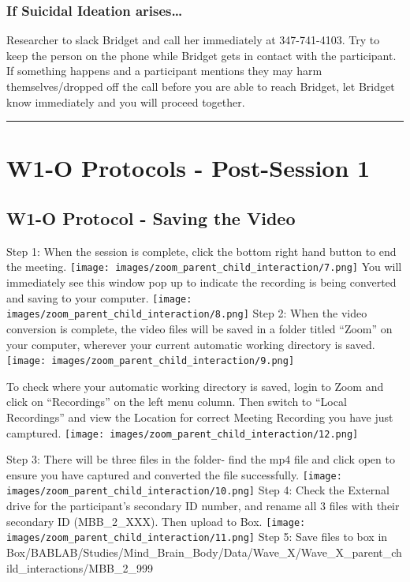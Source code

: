 \documentclass[
]{book}
\begin{document}
\hypertarget{if-suicidal-ideation-arises}{%
\subsubsection{If Suicidal Ideation arises\ldots{}}\label{if-suicidal-ideation-arises}}

Researcher to slack Bridget and call her immediately at 347-741-4103. Try to keep the person on the phone while Bridget gets in contact with the participant. If something happens and a participant mentions they may harm themselves/dropped off the call before you are able to reach Bridget, let Bridget know immediately and you will proceed together.

\begin{center}\rule{0.5\linewidth}{0.5pt}\end{center}

\hypertarget{w1-o-protocols---post-session-1}{%
\section{W1-O Protocols - Post-Session 1}\label{w1-o-protocols---post-session-1}}

\hypertarget{w1-o-protocol---saving-the-video}{%
\subsection{W1-O Protocol - Saving the Video}\label{w1-o-protocol---saving-the-video}}

Step 1:
When the session is complete, click the bottom right hand button to end the meeting. \texttt{[image: images/zoom\_parent\_child\_interaction/7.png]} You will immediately see this window pop up to indicate the recording is being converted and saving to your computer. \texttt{[image: images/zoom\_parent\_child\_interaction/8.png]}
Step 2:
When the video conversion is complete, the video files will be saved in a folder titled ``Zoom'' on your computer, wherever your current automatic working directory is saved. \texttt{[image: images/zoom\_parent\_child\_interaction/9.png]}

To check where your automatic working directory is saved, login to Zoom and click on ``Recordings'' on the left menu column. Then switch to ``Local Recordings'' and view the Location for correct Meeting Recording you have just camptured. \texttt{[image: images/zoom\_parent\_child\_interaction/12.png]}

Step 3:
There will be three files in the folder- find the mp4 file and click open to ensure you have captured and converted the file successfully. \texttt{[image: images/zoom\_parent\_child\_interaction/10.png]}
Step 4:
Check the External drive for the participant's secondary ID number, and rename all 3 files with their secondary ID (MBB\_2\_XXX). Then upload to Box. \texttt{[image: images/zoom\_parent\_child\_interaction/11.png]}
Step 5:
Save files to box in Box/BABLAB/Studies/Mind\_Brain\_Body/Data/Wave\_X/Wave\_X\_parent\_child\_interactions/MBB\_2\_999
\end{document}
